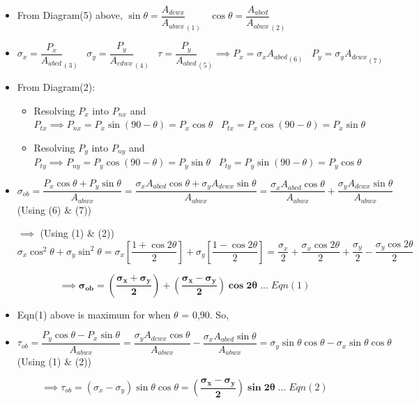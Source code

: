 \documentclass[8pt]{report}
\begin{document}
		\begin{itemize}
			\item From Diagram(5) above, $\boxed{\sin\theta = \dfrac{A_{dcwx}}{A_{abwx}}}_{(1)}\;\;\;\boxed{\cos\theta = \dfrac{A_{abcd}}{A_{abwx}}}_{(2)}$	
			\item $\boxed{\sigma_x=\dfrac{P_x}{A_{abcd}}}_{(3)}\;\;\;\boxed{\sigma_y = \dfrac{P_y}{A_{cdwx}}}_{(4)}\;\;\;\boxed{\tau=\dfrac{P_y}{A_{abcd}}}_{(5)}\implies\boxed{P_x=\sigma_x A_{abcd}}_{(6)}\;\;\;\boxed{P_y=\sigma_y A_{dcwx}}_{(7)}$
			\item From Diagram(2):
			\begin{itemize}
				\item Resolving $P_x$ into $P_{nx}$ and $P_{tx} \implies \boxed{P_{nx} = P_x\sin(90-\theta) = P_x\cos\theta}\;\;\;\boxed{P_{tx} = P_x\cos(90-\theta) = P_x\sin\theta}$
				\item Resolving $P_y$ into $P_{ny}$ and $P_{ty} \implies \boxed{P_{ny} = P_y\cos(90-\theta) = P_y\sin\theta}\;\;\;\boxed{P_{ty} = P_y\sin(90-\theta) = P_y\cos\theta}$
			\end{itemize}								
			\item $\sigma_{ob} = \dfrac{P_x\cos\theta + P_y\sin\theta}{A_{abwx}} = \dfrac{\sigma_xA_{abcd}\cos\theta + \sigma_yA_{dcwx}\sin\theta}{A_{abwx}} = \dfrac{\sigma_xA_{abcd}\cos\theta}{A_{abwx}}+\dfrac{\sigma_yA_{dcwx}\sin\theta}{A_{abwx}}$ (Using (6) \& (7))
			\item[$\implies$] (Using (1) \& (2)) $\sigma_x\cos^2\theta + \sigma_y\sin^2\theta = \sigma_x\left[\dfrac{1+\cos 2\theta}{2}\right] + \sigma_y\left[\dfrac{1-\cos 2\theta}{2}\right] = \dfrac{\sigma_x}{2}+\dfrac{\sigma_x\cos 2\theta}{2}+\dfrac{\sigma_y}{2}-\dfrac{\sigma_y\cos 2\theta}{2}$ 
			\item[] $$\implies \boxed{\pmb{\sigma_{ob} = \left(\dfrac{\sigma_x+\sigma_y}{2}\right)+\left(\dfrac{\sigma_x-\sigma_y}{2}\right)\cos 2\theta}}\;...\;Eqn(1)$$
			\item Eqn(1) above is maximum for when $\theta$ = 0\textdegree ,90\textdegree . So, 
			\item $\tau_{ob} = \dfrac{P_y\cos\theta-P_x\sin\theta}{A_{abwx}} = \dfrac{\sigma_yA_{dcwx}\cos\theta}{A_{abwx}}-\dfrac{\sigma_xA_{abcd}\sin\theta}{A_{abwx}} = \sigma_y\sin\theta\cos\theta - \sigma_x\sin\theta\cos\theta$ (Using (1) \& (2))
			\item[] $$\implies \boxed{\tau_{ob} = (\sigma_x-\sigma_y)\sin\theta\cos\theta = \pmb{\left(\dfrac{\sigma_x-\sigma_y}{2}\right)\sin 2\theta}}\;...\;Eqn(2)$$

\end{itemize}
\end{document}
